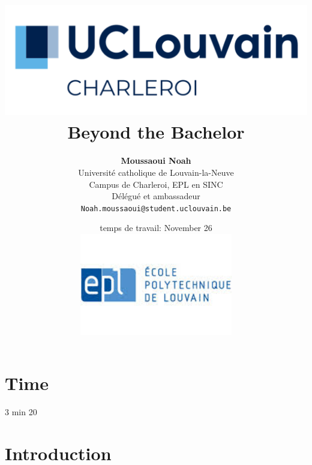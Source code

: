 \documentclass{article}
\begin{document}
\title{
    \includegraphics[width=1\textwidth]{photo/UCLouvain_Charleroi.png} \\
    \vspace{1.5cm}
    {\Huge \textbf{Beyond the Bachelor}} \\
    \vspace{1.5cm}
}

\author{
    \textbf{Moussaoui Noah} \\
    Université catholique de Louvain-la-Neuve \\
    Campus de Charleroi, EPL en SINC \\
    Délégué et ambassadeur \\
    \texttt{Noah.moussaoui@student.uclouvain.be}
}

\date{
    \vspace{1.5cm}
     temps de travail: November 26 \\
    \vspace{1.5cm}
    \includegraphics[width=0.5\textwidth]{photo/EPL.jpeg}
}

\maketitle

\section{Time}
3 min 20

\section{Introduction}
\end{document}

